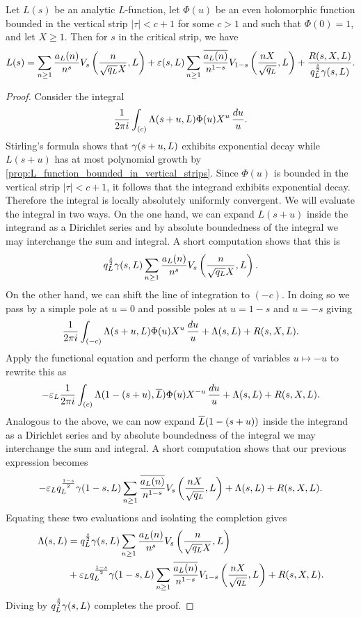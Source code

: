     \begin{theorem*}
      Let \(L(s)\) be an analytic \(L\)-function, let \(\Phi(u)\) be an even holomorphic function bounded in the vertical strip \(|\tau| < c+1\) for some \(c > 1\) and such that \(\Phi(0) = 1\), and let \(X \ge 1\). Then for \(s\) in the critical strip, we have
      \[
        L(s) = \sum_{n \ge 1}\frac{a_{L}(n)}{n^{s}}V_{s}\left(\frac{n}{\sqrt{q_{L}}X},L\right)+\varepsilon(s,L)\sum_{n \ge 1}\frac{\overline{a_{L}(n)}}{n^{1-s}}V_{1-s}\left(\frac{nX}{\sqrt{q_{L}}},L\right)+\frac{R(s,X,L)}{q_{L}^{\frac{s}{2}}\gamma(s,L)}.
      \]
    \end{theorem*}
    \begin{proof}
      Consider the integral
      \[
        \frac{1}{2\pi i}\int_{(c)}\Lambda(s+u,L)\Phi(u)X^{u}\,\frac{du}{u}.
      \]    
      Stirling's formula shows that \(\gamma(s+u,L)\) exhibits exponential decay while \(L(s+u)\) has at most polynomial growth by \cref{prop:L_function_bounded_in_vertical_strips}. Since \(\Phi(u)\) is bounded in the vertical strip \(|\tau| < c+1\), it follows that the integrand exhibits exponential decay. Therefore the integral is locally absolutely uniformly convergent. We will evaluate the integral in two ways. On the one hand, we can expand \(L(s+u)\) inside the integrand as a Dirichlet series and by absolute boundedness of the integral we may interchange the sum and integral. A short computation shows that this is
      \[
        q_{L}^{\frac{s}{2}}\gamma(s,L)\sum_{n \ge 1}\frac{a_{L}(n)}{n^{s}}V_{s}\left(\frac{n}{\sqrt{q_{L}}X},L\right).
      \]
      On the other hand, we can shift the line of integration to \((-c)\). In doing so we pass by a simple pole at \(u = 0\) and possible poles at \(u = 1-s\) and \(u = -s\) giving
      \[
        \frac{1}{2\pi i}\int_{(-c)}\Lambda(s+u,L)\Phi(u)X^{u}\,\frac{du}{u}+\Lambda(s,L)+R(s,X,L).
      \]
      Apply the functional equation and perform the change of variables \(u \mapsto -u\) to rewrite this as
      \[
        -\varepsilon_{L}\frac{1}{2\pi i}\int_{(c)}\Lambda(1-(s+u),\overline{L})\Phi(u)X^{-u}\,\frac{du}{u}+\Lambda(s,L)+R(s,X,L).
      \]
      Analogous to the above, we can now expand \(\overline{L}(1-(s+u))\) inside the integrand as a Dirichlet series and by absolute boundedness of the integral we may interchange the sum and integral. A short computation shows that our previous expression becomes
      \[
        -\varepsilon_{L}q_{L}^{\frac{1-s}{2}}\gamma(1-s,L)\sum_{n \ge 1}\frac{\overline{a_{L}(n)}}{n^{1-s}}V_{s}\left(\frac{nX}{\sqrt{q_{L}}},L\right)+\Lambda(s,L)+R(s,X,L).
      \]
      Equating these two evaluations and isolating the completion gives
      \begin{align*}
        \Lambda(s,L) &= q_{L}^{\frac{s}{2}}\gamma(s,L)\sum_{n \ge 1}\frac{a_{L}(n)}{n^{s}}V_{s}\left(\frac{n}{\sqrt{q_{L}}X},L\right) \\
        &+ \varepsilon_{L}q_{L}^{\frac{1-s}{2}}\gamma(1-s,L)\sum_{n \ge 1}\frac{\overline{a_{L}(n)}}{n^{1-s}}V_{1-s}\left(\frac{nX}{\sqrt{q_{L}}},L\right)+R(s,X,L).
      \end{align*}
      Diving by \(q_{L}^{\frac{s}{2}}\gamma(s,L)\) completes the proof.
    \end{proof}

